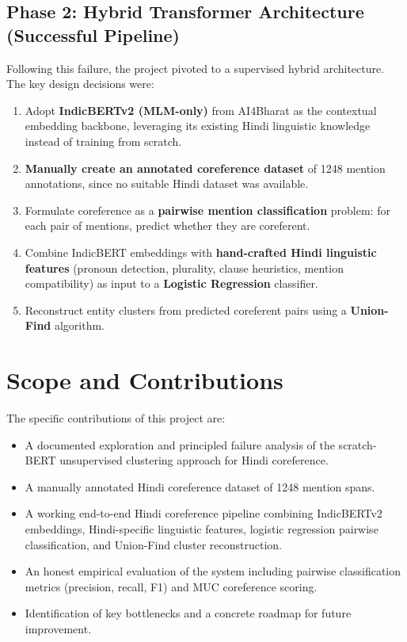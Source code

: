 \documentclass[12pt,a4paper]{report}
\begin{document}
\subsection{Phase 2: Hybrid Transformer Architecture (Successful Pipeline)}

Following this failure, the project pivoted to a supervised hybrid architecture. The key design decisions were:

\begin{enumerate}
    \item Adopt \textbf{IndicBERTv2 (MLM-only)} from AI4Bharat as the contextual embedding backbone, leveraging its existing Hindi linguistic knowledge instead of training from scratch.
    \item \textbf{Manually create an annotated coreference dataset} of 1248 mention annotations, since no suitable Hindi dataset was available.
    \item Formulate coreference as a \textbf{pairwise mention classification} problem: for each pair of mentions, predict whether they are coreferent.
    \item Combine IndicBERT embeddings with \textbf{hand-crafted Hindi linguistic features} (pronoun detection, plurality, clause heuristics, mention compatibility) as input to a \textbf{Logistic Regression} classifier.
    \item Reconstruct entity clusters from predicted coreferent pairs using a \textbf{Union-Find} algorithm.
\end{enumerate}

\section{Scope and Contributions}

The specific contributions of this project are:

\begin{itemize}
    \item A documented exploration and principled failure analysis of the scratch-BERT unsupervised clustering approach for Hindi coreference.
    \item A manually annotated Hindi coreference dataset of 1248 mention spans.
    \item A working end-to-end Hindi coreference pipeline combining IndicBERTv2 embeddings, Hindi-specific linguistic features, logistic regression pairwise classification, and Union-Find cluster reconstruction.
    \item An honest empirical evaluation of the system including pairwise classification metrics (precision, recall, F1) and MUC coreference scoring.
    \item Identification of key bottlenecks and a concrete roadmap for future improvement.
\end{itemize}
\end{document}
